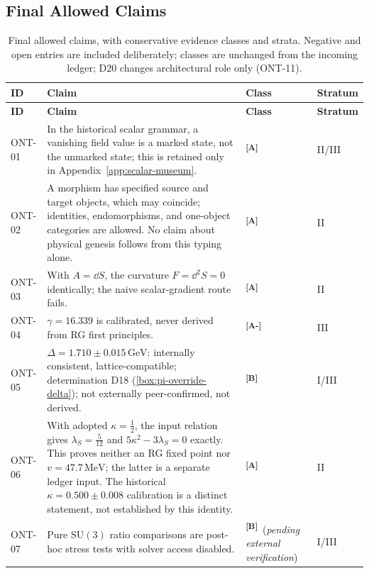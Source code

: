 \documentclass[12pt,a4paper,twoside]{article}
\theoremstyle{plain}
\theoremstyle{definition}
\theoremstyle{remark}
\newcommand{\GeV}{\,\mathrm{GeV}}
\newcommand{\MeV}{\,\mathrm{MeV}}
\newcommand{\catmark}[1]{\textsuperscript{\textsf{\textbf{[#1]}}}}
\newcommand{\DeltaGap}{1.710 \pm 0.015\GeV} %
\newcommand{\GammaGeom}{16.339} %
\newcommand{\vVEV}{47.7\MeV} %
\begin{document}
\subsection{Final Allowed Claims}
\label{sec:final-claims}

{\small
\renewcommand{\arraystretch}{1.3}
\begin{longtable}{p{} p{} p{} p{}}
\caption{Final allowed claims, with conservative evidence classes and
strata. Negative and open entries are included deliberately; classes are
unchanged from the incoming ledger; D20 changes architectural role only (ONT-11).}
\label{tab:claims}\\
\toprule
\textbf{ID} & \textbf{Claim} & \textbf{Class} & \textbf{Stratum} \\
\midrule
\endfirsthead
\toprule
\textbf{ID} & \textbf{Claim} & \textbf{Class} & \textbf{Stratum} \\
\midrule
\endhead
\bottomrule
\endfoot
ONT-01 & In the historical scalar grammar, a vanishing field value is a marked state, not the unmarked state; this is retained only in Appendix~\ref{app:scalar-museum}. & \catmark{A} & II/III \\
ONT-02 & A morphism has specified source and target objects, which may coincide; identities, endomorphisms, and one-object categories are allowed. No claim about physical genesis follows from this typing alone. & \catmark{A} & II \\
ONT-03 & With $A=\dd S$, the curvature $F=\dd^2 S=0$ identically; the naive scalar-gradient route fails. & \catmark{A} & II \\
ONT-04 & $\gamma = \GammaGeom$ is calibrated, never derived from RG first principles. & \catmark{A-} & III \\
ONT-05 & $\Delta = \DeltaGap$: internally consistent, lattice-compatible; determination D18 (\cref{box:pi-override-delta}); not externally peer-confirmed, not derived. & \catmark{B} & I/III \\
ONT-06 & With adopted $\kappa=\tfrac12$, the input relation gives $\lambda_S=\tfrac5{12}$ and $5\kappa^2-3\lambda_S=0$ exactly. This proves neither an RG fixed point nor $v=\vVEV$; the latter is a separate ledger input. The historical $\kappa=0.500\pm0.008$ calibration is a distinct statement, not established by this identity. & \catmark{A} & II \\
ONT-07 & Pure $\mathrm{SU}(3)$ ratio comparisons are post-hoc stress tests with solver access disabled. & \catmark{B}\ (\emph{pending external verification}) & I/III \\

\end{longtable}}
\end{document}
